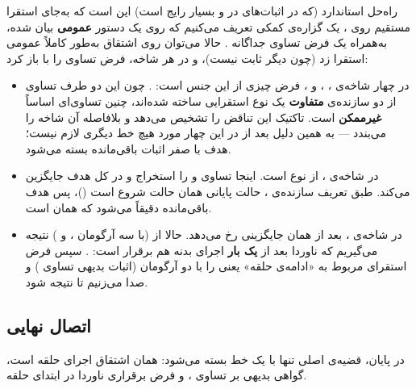 \documentclass[12pt]{report}
\begin{document}
	راه‌حل استاندارد (که در اثبات‌های  در  و  بسیار رایج است) این است که به‌جای استقرا مستقیم روی ، یک گزاره‌ی کمکی  تعریف می‌کنیم که روی یک دستور \textbf{عمومی}  بیان شده، به‌همراه یک فرض تساوی جداگانه . حالا می‌توان روی اشتقاق  به‌طور کاملاً عمومی استقرا زد (چون  دیگر ثابت نیست)، و در هر شاخه، فرض تساوی را با  باز کرد:
	\begin{itemize}
		\item در چهار شاخه‌ی ، ،  و ، فرض  چیزی از این جنس است: . چون این دو طرف تساوی از دو سازنده‌ی \textbf{متفاوت} یک نوع استقرایی ساخته شده‌اند، چنین تساوی‌ای اساساً \textbf{غیرممکن} است. تاکتیک  این تناقض را تشخیص می‌دهد و بلافاصله آن شاخه را می‌بندد --- به همین دلیل بعد از  در این چهار مورد هیچ خط دیگری لازم نیست؛ هدف با صفر اثبات باقی‌مانده بسته می‌شود.
		
		\item در شاخه‌ی ،  از نوع  است. اینجا  تساوی  و  را استخراج و در کل هدف جایگزین می‌کند. طبق تعریف سازنده‌ی ، حالت پایانی همان حالت شروع است ()، پس هدف باقی‌مانده دقیقاً  می‌شود که همان  است.
		
		\item در شاخه‌ی ، بعد از  همان جایگزینی رخ می‌دهد. حالا از  (با سه آرگومان ،  و ) نتیجه می‌گیریم که ناوردا بعد از \textbf{یک بار} اجرای بدنه هم برقرار است: . سپس فرض استقرای مربوط به «ادامه‌ی حلقه» یعنی  را با دو آرگومان 
		 (اثبات بدیهی تساوی ) و  صدا می‌زنیم تا  نتیجه شود.
		
	\end{itemize}
	
	\subsection{اتصال نهایی}
	در پایان، قضیه‌ی اصلی  تنها با یک خط  بسته می‌شود:  همان اشتقاق اجرای حلقه است،  گواهی بدیهی بر تساوی ، و  فرض برقراری ناوردا در ابتدای حلقه.
	
\end{document}
